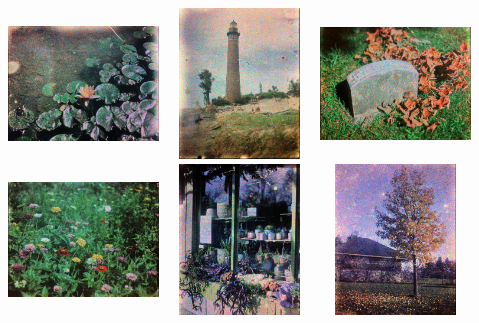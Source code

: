 \documentclass[11pt]{article}
\begin{document}
\begin{center}
\includegraphics[width=4cm, height=4cm]{img/intro_1.jpg}
\includegraphics[width=4cm, height=4cm]{img/intro_2.jpg}
\includegraphics[width=4cm, height=4cm]{img/intro_3.jpg}
\includegraphics[width=4cm, height=4cm]{img/intro_4.jpg}
\includegraphics[width=4cm, height=4cm]{img/intro_5.jpg}
\includegraphics[width=4cm, height=4cm]{img/intro_6.jpg}

\end{center}
\end{document}
